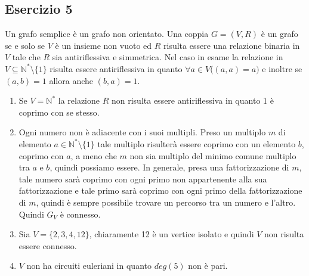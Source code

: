 \subsection*{Esercizio 5}
Un grafo semplice è un grafo non orientato. Una coppia $G=(V,R)$ è un grafo se e solo se $V$ è un insieme non vuoto ed $R$ risulta essere una relazione binaria in $V$ tale che $R$ sia antiriflessiva e simmetrica. Nel caso in esame la relazione in $V \subseteq \mathbb{N}^{*} \setminus \{1\}$ risulta essere antiriflessiva in quanto $\forall a \in V \bigl((a,a)=a\bigr)$ e inoltre se $(a,b)=1$ allora anche $(b,a)=1$.
\begin{enumerate}[label=(\textit{\roman*})]
	\item Se $V=\mathbb{N}^{*}$ la relazione $R$ non risulta essere antiriflessiva in quanto 1 è coprimo con se stesso.
	\item Ogni numero non è adiacente con i suoi multipli. Preso un multiplo $m$ di elemento $a \in \mathbb{N}^{*} \setminus \{1\}$ tale multiplo risulterà essere coprimo con un elemento $b$, coprimo con $a$, a meno che $m$ non sia multiplo del minimo comune multiplo tra $a$ e $b$, quindi possiamo essere. In generale, presa una fattorizzazione di $m$, tale numero sarà coprimo con ogni primo non appartenente alla sua fattorizzazione e tale primo sarà coprimo con ogni primo della fattorizzazione di $m$, quindi è sempre possibile trovare un percorso tra un numero e l'altro. Quindi $G_{V}$ è connesso.
	\item Sia $V=\{2,3,4,12\}$, chiaramente 12 è un vertice isolato e quindi $V$ non risulta essere connesso.
	\item $V$ non ha circuiti euleriani in quanto $deg(5)$ non è pari.
\end{enumerate}


